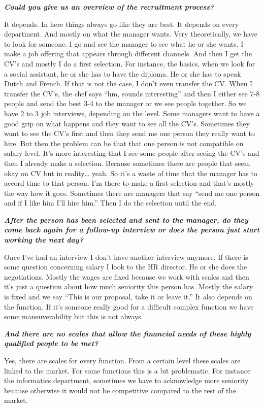 \documentclass[a4paper,fleqn,11pt,dvips,titlepage]{article}
\newcommand{\question}[1]{\textbf{\textit{#1}}}
\numberwithin{figure}{section}
\numberwithin{equation}{section}
\begin{document}
\question{Could you give us an overview of the recruitment process?}

It depends. In here things always go like they are best. It depends on every department. And mostly on what the manager wants. Very theoretically, we have to look for someone. I go and see the manager to see what he or she wants. I make a job offering that appears through different channels. And then I get the CV’s and mostly I do a first selection. For instance, the basics, when we look for a social assistant, he or she has to have the diploma. He or she has to speak Dutch and French. If that is not the case, I don’t even transfer the CV. When I transfer the CV’s, the chef says “hm, sounds interesting” and then I either see 7-8 people and send the best 3-4 to the manager or we see people together. So we have 2 to 3 job interviews, depending on the level. Some managers want to have a good grip on what happens and they want to see all the CV’s. Sometimes they want to see the CV’s first and then they send me one person they really want to hire. But then the problem can be that that one person is not compatible on salary level. It’s more interesting that I see some people after seeing the CV’s and then I already make a selection. Because sometimes there are people that seem okay on CV but in reality… yeah. So it’s a waste of time that the manager has to accord time to that person. I’m there to make a first selection and that’s mostly the way how it goes. Sometimes there are managers that say “send me one person and if I like him I’ll hire him.” Then I do the selection until the end. 

\question{After the person has been selected and sent to the manager, do they come back again for a follow-up interview or does the person just start working the next day?}

Once I’ve had an interview I don’t have another interview anymore. If there is some question concerning salary I look to the HR director. He or she does the negotiations. Mostly the wages are fixed because we work with scales and then it’s just a question about how much seniority this person has. Mostly the salary is fixed and we say “This is our proposal, take it or leave it.” It also depends on the function. If it’s someone really good for a difficult complex function we have some maneuverability but this is not always. 

\question{And there are no scales that allow the financial needs of these highly qualified people to be met?}

Yes, there are scales for every function. From a certain level these scales are linked to the market. For some functions this is a bit problematic. For instance the informatics department, sometimes we have to acknowledge more seniority because otherwise it would not be competitive compared to the rest of the market. 
\end{document}
